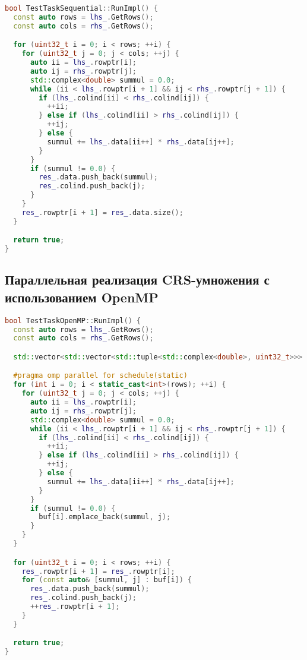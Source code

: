 \documentclass[a4paper,12pt]{article}
\begin{document}
\begin{lstlisting}[language=C++,caption={Реализация CRS-умножения матриц в последовательной версии}]
bool TestTaskSequential::RunImpl() {
  const auto rows = lhs_.GetRows();
  const auto cols = rhs_.GetRows();

  for (uint32_t i = 0; i < rows; ++i) {
    for (uint32_t j = 0; j < cols; ++j) {
      auto ii = lhs_.rowptr[i];
      auto ij = rhs_.rowptr[j];
      std::complex<double> summul = 0.0;
      while (ii < lhs_.rowptr[i + 1] && ij < rhs_.rowptr[j + 1]) {
        if (lhs_.colind[ii] < rhs_.colind[ij]) {
          ++ii;
        } else if (lhs_.colind[ii] > rhs_.colind[ij]) {
          ++ij;
        } else {
          summul += lhs_.data[ii++] * rhs_.data[ij++];
        }
      }
      if (summul != 0.0) {
        res_.data.push_back(summul);
        res_.colind.push_back(j);
      }
    }
    res_.rowptr[i + 1] = res_.data.size();
  }

  return true;
}
\end{lstlisting}

\subsection{Параллельная реализация CRS-умножения с использованием OpenMP}

\begin{lstlisting}[language=C++,caption={CRS-умножение матриц с использованием OpenMP}]
bool TestTaskOpenMP::RunImpl() {
  const auto rows = lhs_.GetRows();
  const auto cols = rhs_.GetRows();

  std::vector<std::vector<std::tuple<std::complex<double>, uint32_t>>> buf(rows);

  #pragma omp parallel for schedule(static)
  for (int i = 0; i < static_cast<int>(rows); ++i) {
    for (uint32_t j = 0; j < cols; ++j) {
      auto ii = lhs_.rowptr[i];
      auto ij = rhs_.rowptr[j];
      std::complex<double> summul = 0.0;
      while (ii < lhs_.rowptr[i + 1] && ij < rhs_.rowptr[j + 1]) {
        if (lhs_.colind[ii] < rhs_.colind[ij]) {
          ++ii;
        } else if (lhs_.colind[ii] > rhs_.colind[ij]) {
          ++ij;
        } else {
          summul += lhs_.data[ii++] * rhs_.data[ij++];
        }
      }
      if (summul != 0.0) {
        buf[i].emplace_back(summul, j);
      }
    }
  }

  for (uint32_t i = 0; i < rows; ++i) {
    res_.rowptr[i + 1] = res_.rowptr[i];
    for (const auto& [summul, j] : buf[i]) {
      res_.data.push_back(summul);
      res_.colind.push_back(j);
      ++res_.rowptr[i + 1];
    }
  }

  return true;
}
\end{lstlisting}
\end{document}

